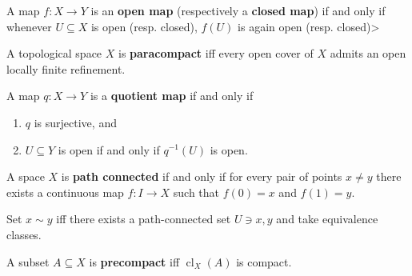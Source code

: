 \begin{definition}\label{def:open_closed_maps}

A map \(f:X\to Y\) is an \textbf{open map} (respectively a
\textbf{closed map}) if and only if whenever \(U \subseteq X\) is open
(resp. closed), \(f(U)\) is again open (resp. closed)\textgreater{}

\end{definition}

\begin{definition}[Paracompact]

A topological space \(X\) is \textbf{paracompact} iff every open cover
of \(X\) admits an open locally finite refinement.

\end{definition}

\begin{definition}

A map \(q:X\to Y\) is a \textbf{quotient map} if and only if

\begin{enumerate}
\def\labelenumi{\arabic{enumi}.}
\tightlist
\item
  \(q\) is surjective, and
\item
  \(U \subseteq Y\) is open if and only if \(q ^{-1} (U)\) is open.
\end{enumerate}

\end{definition}

\begin{definition}

A space \(X\) is \textbf{path connected} if and only if for every pair
of points \(x\neq y\) there exists a continuous map \(f:I \to X\) such
that \(f(0) = x\) and \(f(1) = y\).

\end{definition}

\begin{definition}

Set \(x\sim y\) iff there exists a path-connected set \(U\ni x, y\) and
take equivalence classes.

\end{definition}

\begin{definition}[Precompact]

A subset \(A\subseteq X\) is \textbf{precompact} iff
\(\operatorname{cl}_{X}(A)\) is compact.

\end{definition}

